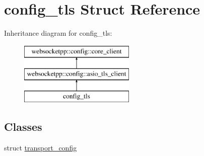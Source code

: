 \hypertarget{structconfig__tls}{}\section{config\+\_\+tls Struct Reference}
\label{structconfig__tls}
Inheritance diagram for config\+\_\+tls\+:\begin{figure}[H]
\begin{center}
\leavevmode
\includegraphics[height=3.000000cm]{structconfig__tls}
\end{center}
\end{figure}
\subsection*{Classes}
\begin{DoxyCompactItemize}
\item 
struct \hyperlink{structconfig__tls_1_1transport__config}{transport\+\_\+config}
\end{DoxyCompactItemize}
